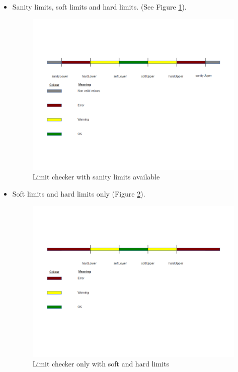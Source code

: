 \begin{itemize}
\item Sanity limits, soft limits and hard limits. (See Figure \ref{f4.2}).
\begin{figure}[H]
\centerline{\includegraphics[width=1.2\textwidth]{images/LimitChecking1.png}}
\caption{Limit checker with sanity limits available}
\label{f4.2}
\end{figure}
\pagebreak
\item Soft limits and hard limits only (Figure \ref{f4.3}).
\begin{figure}[H]
\centerline{\includegraphics[width=1.2\textwidth]{images/LimitChecking2.png}}
\caption{Limit checker only with soft and hard limits}
\label{f4.3}
\end{figure}
\end{itemize}

